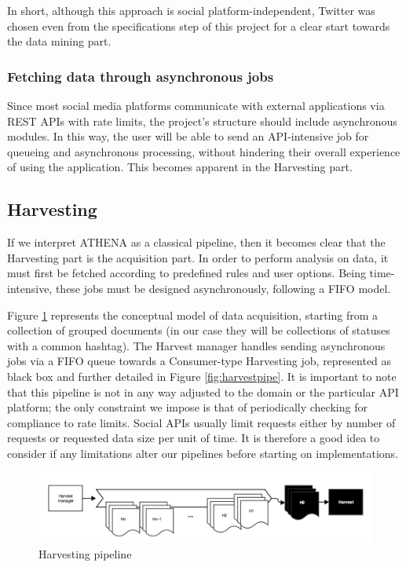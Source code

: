 In short, although this approach is social platform-independent, Twitter was chosen even from the specifications step of this project for a clear start towards the data mining part.

\subsubsection{Fetching data through asynchronous jobs}
Since most social media platforms communicate with external applications via REST APIs with rate limits, the project's structure should include asynchronous modules. In this way, the user will be able to send an API-intensive job for queueing and asynchronous processing, without hindering their overall experience of using the application. This becomes apparent in the Harvesting part.

\subsection{Harvesting}
If we interpret ATHENA as a classical pipeline, then it becomes clear that the Harvesting part is the acquisition part. In order to perform analysis on data, it must first be fetched according to predefined rules and user options. Being time-intensive, these jobs must be designed asynchronously, following a FIFO model.

Figure \ref{fig:harvestpipe1} represents the conceptual model of data acquisition, starting from a collection of grouped documents (in our case they will be collections of statuses with a common hashtag). The Harvest manager handles sending asynchronous jobs via a FIFO queue towards a Consumer-type Harvesting job, represented as black box and further detailed in Figure \ref{fig:harvestpipe}. It is important to note that this pipeline is not in any way adjusted to the domain or the particular API platform; the only constraint we impose is that of periodically checking for compliance to rate limits. Social APIs usually limit requests either by number of requests or requested data size per unit of time. It is therefore a good idea to consider if any limitations alter our pipelines before starting on implementations.

\begin{figure}[ht]
    \centering
\includegraphics[width=\columnwidth]{img/harvestpipe1.png}
    \caption{Harvesting pipeline}
    \label{fig:harvestpipe1}
\end{figure}


